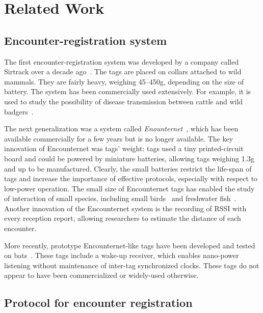 \section{Related Work}
\label{sec:related-work}

\subsection{Encounter-registration system}
The first encounter-registration system was developed by a company called Sirtrack 
over a decade ago~\cite{Prangle2006NewRadiocolars}. The tags
are placed on collars attached to wild mammals. 
They are fairly heavy, weighing 45--450g, depending on the
size of battery. %
The system has been commercially used extensively. For example, it is used to study 
the possibility of disease transmission between cattle 
and wild badgers~\cite{Bohm2009WildlifeLivestock}.

The next generalization was a system called {\em Enounternet}~\cite{Menhill2012NovelTelemetry,Rutz2012AutomatedMapping}, 
which has been available commercially for a few years
but is no longer available. The key innovation of Encounternet was tags' weight: 
tags used a tiny printed-circuit board and
could be powered by miniature batteries, allowing tags weighing 1.3g and up to be manufactured. 
Clearly, the small batteries restrict the life-span of tags and increase the importance of effective protocols, 
especially with respect to low-power operation. 
The small size of Encounternet tags has enabled the study of interaction of small species, 
including small birds~\cite{Levin2015Performance} and freshwater fish~\cite{Tentelier2016FishNetwork}.
Another innovation of the Encounternet system is the recording of RSSI with every reception report, allowing
researchers to estimate the distance of each encounter. 

More recently, prototype Encounternet-like tags have been developed and tested on
bats~\cite{Ripperger2016ProximitySensing,dressler2016bats}. These tags include a wake-up receiver, which
enables nano-power listening without maintenance of inter-tag synchronized clocks. These tags  
do not appear to have been commercialized or widely-used otherwise.




\subsection{Protocol for encounter registration}


